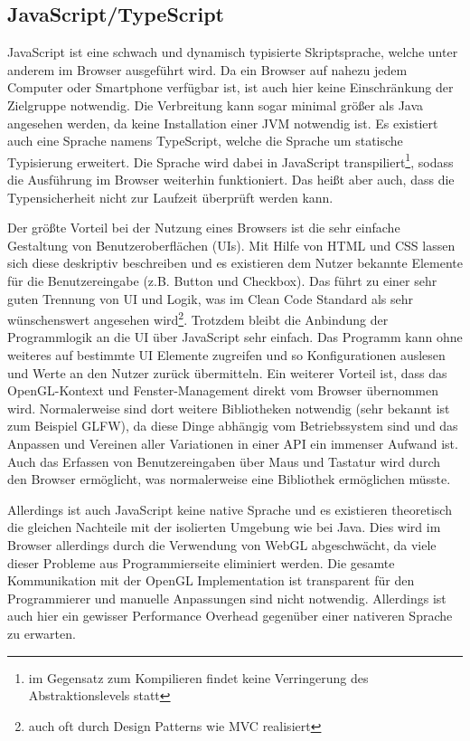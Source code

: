 \subsection{JavaScript/TypeScript}
JavaScript ist eine schwach und dynamisch typisierte Skriptsprache, welche unter anderem im Browser ausgeführt wird. Da ein Browser auf nahezu jedem Computer oder Smartphone verfügbar ist, ist auch hier keine Einschränkung der Zielgruppe notwendig. Die Verbreitung kann sogar minimal größer als Java angesehen werden, da keine Installation einer JVM notwendig ist. Es existiert auch eine Sprache namens TypeScript, welche die Sprache um statische Typisierung erweitert. Die Sprache wird dabei in JavaScript transpiliert\footnote{im Gegensatz zum Kompilieren findet keine Verringerung des Abstraktionslevels statt}, sodass die Ausführung im Browser weiterhin funktioniert. Das heißt aber auch, dass die Typensicherheit nicht zur Laufzeit überprüft werden kann.

Der größte Vorteil bei der Nutzung eines Browsers ist die sehr einfache Gestaltung von Benutzeroberflächen (UIs). Mit Hilfe von HTML und CSS lassen sich diese deskriptiv beschreiben und es existieren dem Nutzer bekannte Elemente für die Benutzereingabe (z.B. Button und Checkbox). Das führt zu einer sehr guten Trennung von UI und Logik, was im Clean Code Standard als sehr wünschenswert angesehen wird\footnote{auch oft durch Design Patterns wie MVC realisiert}. Trotzdem bleibt die Anbindung der Programmlogik an die UI über JavaScript sehr einfach. Das Programm kann ohne weiteres auf bestimmte UI Elemente zugreifen und so Konfigurationen auslesen und Werte an den Nutzer zurück übermitteln. Ein weiterer Vorteil ist, dass das OpenGL-Kontext und Fenster-Management direkt vom Browser übernommen wird. Normalerweise sind dort weitere Bibliotheken notwendig (sehr bekannt ist zum Beispiel GLFW), da diese Dinge abhängig vom Betriebssystem sind und das Anpassen und Vereinen aller Variationen in einer API ein immenser Aufwand ist. Auch das Erfassen von Benutzereingaben über Maus und Tastatur wird durch den Browser ermöglicht, was normalerweise eine Bibliothek ermöglichen müsste.

Allerdings ist auch JavaScript keine native Sprache und es existieren theoretisch die gleichen Nachteile mit der isolierten Umgebung wie bei Java. Dies wird im Browser allerdings durch die Verwendung von WebGL abgeschwächt, da viele dieser Probleme aus Programmierseite eliminiert werden. Die gesamte Kommunikation mit der OpenGL Implementation ist transparent für den Programmierer und manuelle Anpassungen sind nicht notwendig. Allerdings ist auch hier ein gewisser Performance Overhead gegenüber einer nativeren Sprache zu erwarten.

